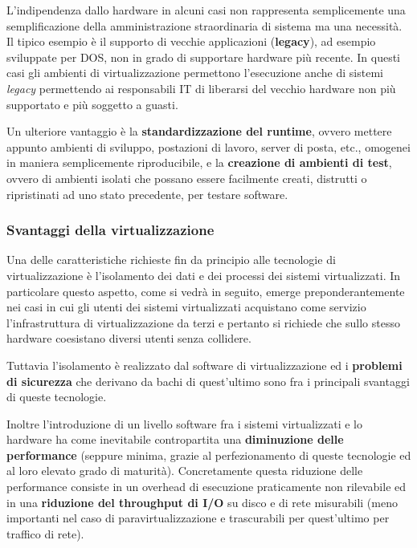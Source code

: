 \documentclass[italian,]{article}
\begin{document}
L'indipendenza dallo hardware in alcuni casi non rappresenta
semplicemente una semplificazione della amministrazione straordinaria di
sistema ma una necessità. Il tipico esempio è il supporto di vecchie
applicazioni (\textbf{legacy}), ad esempio sviluppate per DOS, non in
grado di supportare hardware più recente. In questi casi gli ambienti di
virtualizzazione permettono l'esecuzione anche di sistemi \emph{legacy}
permettendo ai responsabili IT di liberarsi del vecchio hardware non più
supportato e più soggetto a guasti.

Un ulteriore vantaggio è la \textbf{standardizzazione del runtime},
ovvero mettere appunto ambienti di sviluppo, postazioni di lavoro,
server di posta, etc., omogenei in maniera semplicemente riproducibile,
e la \textbf{creazione di ambienti di test}, ovvero di ambienti isolati
che possano essere facilmente creati, distrutti o ripristinati ad uno
stato precedente, per testare software.

\subsubsection{Svantaggi della
virtualizzazione}\label{svantaggi-della-virtualizzazione}

Una delle caratteristiche richieste fin da principio alle tecnologie di
virtualizzazione è l'isolamento dei dati e dei processi dei sistemi
virtualizzati. In particolare questo aspetto, come si vedrà in seguito,
emerge preponderantemente nei casi in cui gli utenti dei sistemi
virtualizzati acquistano come servizio l'infrastruttura di
virtualizzazione da terzi e pertanto si richiede che sullo stesso
hardware coesistano diversi utenti senza collidere.

Tuttavia l'isolamento è realizzato dal software di virtualizzazione ed i
\textbf{problemi di sicurezza} che derivano da bachi di quest'ultimo
sono fra i principali svantaggi di queste tecnologie.

Inoltre l'introduzione di un livello software fra i sistemi
virtualizzati e lo hardware ha come inevitabile contropartita una
\textbf{diminuzione delle performance} (seppure minima, grazie al
perfezionamento di queste tecnologie ed al loro elevato grado di
maturità). Concretamente questa riduzione delle performance consiste in
un overhead di esecuzione praticamente non rilevabile ed in una
\textbf{riduzione del throughput di I/O} su disco e di rete misurabili
(meno importanti nel caso di paravirtualizzazione e trascurabili per
quest'ultimo per traffico di rete).
\end{document}
